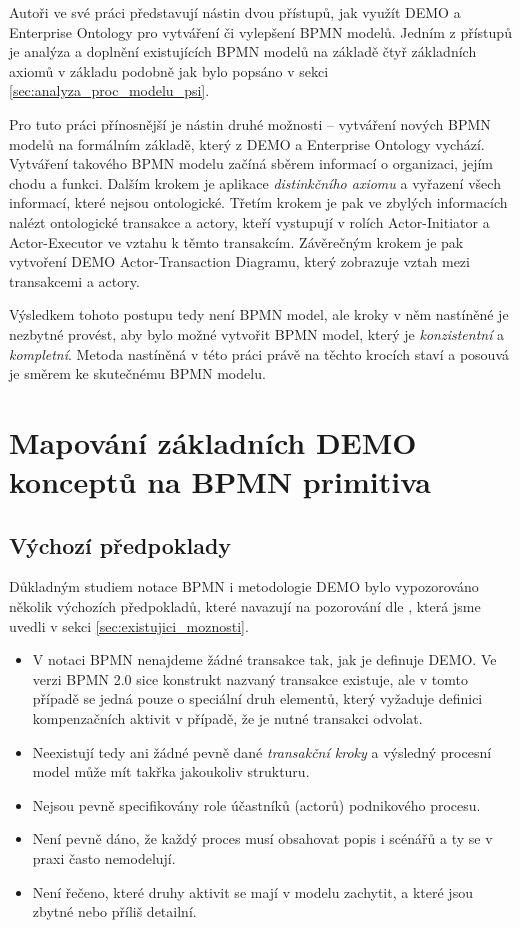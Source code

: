Autoři ve své práci představují nástin dvou přístupů, jak využít DEMO a Enterprise Ontology pro vytváření či vylepšení BPMN modelů. Jedním z přístupů je analýza a doplnění existujících BPMN modelů na základě čtyř základních axiomů \ptheory{} v základu podobně jak bylo popsáno v sekci \ref{sec:analyza_proc_modelu_psi}. 

Pro tuto práci přínosnější je nástin druhé možnosti – vytváření nových BPMN modelů na formálním základě, který z DEMO a Enterprise Ontology vychází. Vytváření takového BPMN modelu začíná sběrem informací o organizaci, jejím chodu a funkci. Dalším krokem je aplikace \textit{distinkčního axiomu} a  vyřazení všech informací, které nejsou ontologické. Třetím krokem je pak ve zbylých informacích nalézt ontologické transakce a actory, kteří vystupují v rolích Actor-Initiator a Actor-Executor ve vztahu k těmto transakcím. Závěrečným krokem je pak vytvoření DEMO Actor-Transaction Diagramu, který zobrazuje vztah mezi transakcemi a actory. 

Výsledkem tohoto postupu tedy není BPMN model, ale kroky v něm nastíněné je nezbytné provést, aby bylo možné vytvořit BPMN model, který je \textit{konzistentní} a \textit{kompletní}. Metoda nastíněná v této práci právě na těchto krocích staví a posouvá je směrem ke skutečnému BPMN modelu.

\section{Mapování základních DEMO konceptů na BPMN primitiva}
\subsection{Výchozí předpoklady}
Důkladným studiem notace BPMN i metodologie DEMO bylo vypozorováno několik výchozích předpokladů, které navazují na pozorování dle \cite{VanNuffel2009}, která jsme uvedli v sekci \ref{sec:existujici_moznosti}.

\begin{itemize}
\item V notaci BPMN nenajdeme žádné transakce tak, jak je definuje DEMO. Ve verzi BPMN 2.0 sice konstrukt nazvaný transakce existuje, ale v tomto případě se jedná pouze o speciální druh elementů, který vyžaduje definici kompenzačních aktivit v případě, že je nutné transakci odvolat.
\item Neexistují tedy ani žádné pevně dané \textit{transakční kroky} a výsledný procesní model může mít takřka jakoukoliv strukturu.
\item Nejsou pevně specifikovány role účastníků (actorů) podnikového procesu.
\item Není pevně dáno, že každý proces musí obsahovat popis  i  scénářů a ty  se v praxi často nemodelují.
\item Není řečeno, které druhy aktivit se mají v modelu zachytit, a které jsou zbytné nebo příliš detailní.
\end{itemize}

